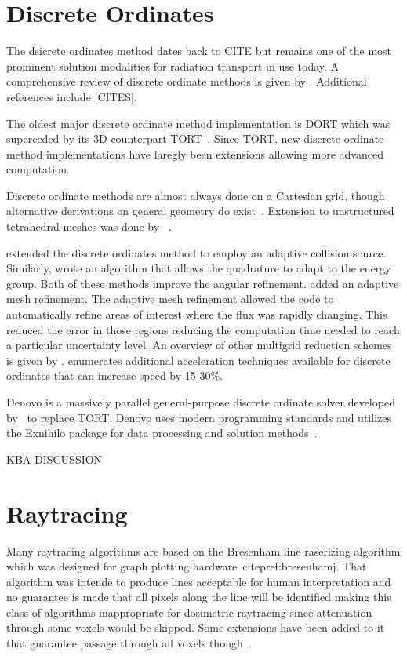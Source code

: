 \section{Discrete Ordinates}\label{sec:discordlit}
The dsicrete ordinates method dates back to CITE but remains one of the most prominent solution modalities for radiation transport in use today. A comprehensive review of discrete ordinate methods is given by \citet{ref:lewise}. Additional references include [CITES].

The oldest major discrete ordinate method implementation is DORT which was superceded by its 3D counterpart TORT~\citep{ref:rhoadesw}. Since TORT, new discrete ordinate method implementations have laregly been extensions allowing more advanced computation.

Discrete ordinate methods are almost always done on a Cartesian grid, though alternative derivations on general geometry do exist~\citep{ref:dehart}. Extension to unstructured tetrahedral meshes was done by ~\citet{ref:wareingt}.

\citet{ref:waltersw} extended the discrete ordinates method to employ an adaptive collision source. Similarly, \citet{ref:ahrensc} wrote an algorithm that allows the quadrature to adapt to the energy group. Both of these methods improve the angular refinement. \citet{ref:ibrahima} added an adaptive mesh refinement. The adaptive mesh refinement allowed the code to automatically refine areas of interest where the flux was rapidly changing. This reduced the error in those regions reducing the computation time needed to reach a particular uncertainty level. An overview of other multigrid reduction schemes is given by \citet{ref:leeb}. \citet{ref:efremenkod} enumerates additional acceleration techniques available for discrete ordinates that can increase speed by 15-30\%.

Denovo is a massively parallel general-purpose discrete ordinate solver developed by~\citet{ref:evanst} to replace TORT. Denovo uses modern programming standards and utilizes the Exnihilo package for data processing and solution methods~\citep{ref:evanst2}. 

KBA DISCUSSION

\section{Raytracing}

Many raytracing algorithms are based on the Bresenham line raserizing algorithm which was designed for graph plotting hardware~citep{ref:bresenhamj}. That algorithm was intende to produce lines acceptable for human interpretation and no guarantee is made that all pixels along the line will be identified making this class of algorithms inappropriate for dosimetric raytracing since attenuation through some voxels would be skipped. Some extensions have been added to it that guarantee passage through all voxels though~\citep{ref:liuy}.


